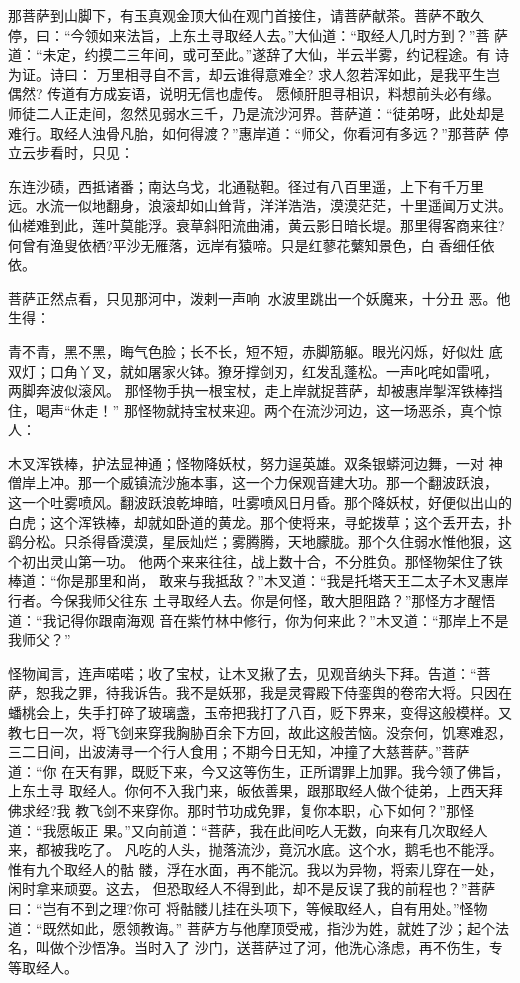 那菩萨到山脚下，有玉真观金顶大仙在观门首接住，请菩萨献茶。菩萨不敢久
停，曰：“今领如来法旨，上东土寻取经人去。”大仙道：“取经人几时方到？”菩
萨道：“未定，约摸二三年间，或可至此。”遂辞了大仙，半云半雾，约记程途。有
诗为证。诗曰：
万里相寻自不言，却云谁得意难全?
求人忽若浑如此，是我平生岂偶然?
传道有方成妄语，说明无信也虚传。
愿倾肝胆寻相识，料想前头必有缘。
师徒二人正走间，忽然见弱水三千，乃是流沙河界。菩萨道：“徒弟呀，此处却是
难行。取经人浊骨凡胎，如何得渡？”惠岸道：“师父，你看河有多远？”那菩萨
停立云步看时，只见：

东连沙碛，西抵诸番；南达乌戈，北通鞑靼。径过有八百里遥，上下有千万里
远。水流一似地翻身，浪滚却如山耸背，洋洋浩浩，漠漠茫茫，十里遥闻万丈洪。
仙槎难到此，莲叶莫能浮。衰草斜阳流曲浦，黄云影日暗长堤。那里得客商来往?
何曾有渔叟依栖?平沙无雁落，远岸有猿啼。只是红蓼花蘩知景色，白香细任依
依。

菩萨正然点看，只见那河中，泼剌一声响，水波里跳出一个妖魔来，十分丑
恶。他生得：

青不青，黑不黑，晦气色脸；长不长，短不短，赤脚筋躯。眼光闪烁，好似灶
底双灯；口角丫叉，就如屠家火钵。獠牙撑剑刃，红发乱蓬松。一声叱咤如雷吼，
两脚奔波似滚风。
那怪物手执一根宝杖，走上岸就捉菩萨，却被惠岸掣浑铁棒挡住，喝声“休走！”
那怪物就持宝杖来迎。两个在流沙河边，这一场恶杀，真个惊人：

木叉浑铁棒，护法显神通；怪物降妖杖，努力逞英雄。双条银蟒河边舞，一对
神僧岸上冲。那一个威镇流沙施本事，这一个力保观音建大功。那一个翻波跃浪，
这一个吐雾喷风。翻波跃浪乾坤暗，吐雾喷风日月昏。那个降妖杖，好便似出山的
白虎；这个浑铁棒，却就如卧道的黄龙。那个使将来，寻蛇拨草；这个丢开去，扑
鹞分松。只杀得昏漠漠，星辰灿烂；雾腾腾，天地朦胧。那个久住弱水惟他狠，这
个初出灵山第一功。
他两个来来往往，战上数十合，不分胜负。那怪物架住了铁棒道：“你是那里和尚，
敢来与我抵敌？”木叉道：“我是托塔天王二太子木叉惠岸行者。今保我师父往东
土寻取经人去。你是何怪，敢大胆阻路？”那怪方才醒悟道：“我记得你跟南海观
音在紫竹林中修行，你为何来此？”木叉道：“那岸上不是我师父？”

怪物闻言，连声喏喏；收了宝杖，让木叉揪了去，见观音纳头下拜。告道：“菩
萨，恕我之罪，待我诉告。我不是妖邪，我是灵霄殿下侍銮舆的卷帘大将。只因在
蟠桃会上，失手打碎了玻璃盏，玉帝把我打了八百，贬下界来，变得这般模样。又
教七日一次，将飞剑来穿我胸胁百余下方回，故此这般苦恼。没奈何，饥寒难忍，
三二日间，出波涛寻一个行人食用；不期今日无知，冲撞了大慈菩萨。”菩萨道：“你
在天有罪，既贬下来，今又这等伤生，正所谓罪上加罪。我今领了佛旨，上东土寻
取经人。你何不入我门来，皈依善果，跟那取经人做个徒弟，上西天拜佛求经?我
教飞剑不来穿你。那时节功成免罪，复你本职，心下如何？”那怪道：“我愿皈正
果。”又向前道：“菩萨，我在此间吃人无数，向来有几次取经人来，都被我吃了。
凡吃的人头，抛落流沙，竟沉水底。这个水，鹅毛也不能浮。惟有九个取经人的骷
髅，浮在水面，再不能沉。我以为异物，将索儿穿在一处，闲时拿来顽耍。这去，
但恐取经人不得到此，却不是反误了我的前程也？”菩萨曰：“岂有不到之理?你可
将骷髅儿挂在头项下，等候取经人，自有用处。”怪物道：“既然如此，愿领教诲。”
菩萨方与他摩顶受戒，指沙为姓，就姓了沙；起个法名，叫做个沙悟净。当时入了
沙门，送菩萨过了河，他洗心涤虑，再不伤生，专等取经人。

